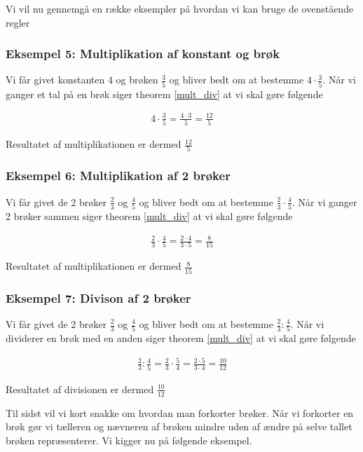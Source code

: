 Vi vil nu gennemgå en række eksempler på hvordan vi kan bruge de ovenstående regler

\subsubsection*{Eksempel 5: Multiplikation af konstant og brøk}

Vi får givet konstanten $4$ og brøken $\frac{3}{5}$ og bliver bedt om at bestemme $4\cdot \frac{3}{5}$. Når vi ganger et tal på en brøk siger theorem \ref{mult_div} at vi skal gøre følgende

\begin{align*}
4\cdot \frac{3}{5} = \frac{4\cdot 3}{5} = \frac{12}{5}
\end{align*}

Resultatet af multiplikationen er dermed $\frac{12}{5}$


\subsubsection*{Eksempel 6: Multiplikation af 2 brøker}

Vi får givet de 2 brøker $\frac{2}{3}$ og $\frac{4}{5}$ og bliver bedt om at bestemme $\frac{2}{3} \cdot \frac{4}{5}$. Når vi ganger 2 brøker sammen siger theorem \ref{mult_div} at vi skal gøre følgende

\begin{align*}
\frac{2}{3} \cdot \frac{4}{5} = \frac{2\cdot 4}{3\cdot 5} = \frac{8}{15}
\end{align*}

Resultatet af multiplikationen er dermed $\frac{8}{15}$

\subsubsection*{Eksempel 7: Divison af 2 brøker}

Vi får givet de 2 brøker $\frac{2}{3}$ og $\frac{4}{5}$ og bliver bedt om at bestemme $\frac{2}{3} : \frac{4}{5}$. Når vi dividerer en brøk med en anden siger theorem \ref{mult_div} at vi skal gøre følgende

\begin{align*}
\frac{2}{3} : \frac{4}{5} = \frac{2}{3} \cdot \frac{5}{4} = \frac{2\cdot 5}{3\cdot 4} = \frac{10}{12}
\end{align*}

Resultatet af divisionen er dermed $\frac{10}{12}$


Til sidst vil vi kort snakke om hvordan man forkorter brøker. Når vi forkorter en brøk gør vi tælleren og nævneren af brøken mindre uden af ændre på selve tallet brøken repræsenterer.
Vi kigger nu på følgende eksempel.


